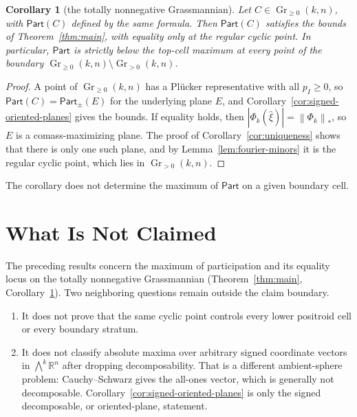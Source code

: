 \documentclass[11pt]{article}
\newtheorem{corollary}[theorem]{Corollary}
\newcommand{\Gr}{\operatorname{Gr}}
\newcommand{\Part}{\mathsf{Part}}
\newcommand{\R}{\mathbb{R}}
\newcommand{\abs}[1]{\left|#1\right|}
\newcommand{\norm}[1]{\left\|#1\right\|}
\begin{document}
\begin{corollary}[the totally nonnegative Grassmannian]\label{cor:tnn}
Let \(C\in\Gr_{\ge0}(k,n)\), with \(\Part(C)\) defined by the same formula.  Then \(\Part(C)\)
satisfies the bounds of Theorem~\ref{thm:main}, with equality only at the regular cyclic point.
In particular, \(\Part\) is strictly below the top-cell maximum at every point of the boundary
\(\Gr_{\ge0}(k,n)\setminus\Gr_{>0}(k,n)\).
\end{corollary}

\begin{proof}
A point of \(\Gr_{\ge0}(k,n)\) has a Plücker representative with all \(p_I\ge0\), so
\(\Part(C)=\Part_{\pm}(E)\) for the underlying plane \(E\), and
Corollary~\ref{cor:signed-oriented-planes} gives the bounds.  If equality holds, then
\(\abs{\Phi_k(\widehat{\xi})}=\norm{\Phi_k}_*\), so \(E\) is a comass-maximizing plane.  The
proof of Corollary~\ref{cor:uniqueness} shows that there is only one such plane, and by
Lemma~\ref{lem:fourier-minors} it is the regular cyclic point, which lies in \(\Gr_{>0}(k,n)\).
\end{proof}

\noindent The corollary does not determine the maximum of \(\Part\) on a given boundary cell.

\section{What Is Not Claimed}

The preceding results concern the maximum of participation and its equality
locus on the totally nonnegative Grassmannian
(Theorem~\ref{thm:main}, Corollary~\ref{cor:tnn}).  Two neighboring questions
remain outside the claim boundary.

\begin{enumerate}
\item It does not prove that the same cyclic point controls every lower
  positroid cell or every boundary stratum.
\item It does not classify absolute maxima over arbitrary signed coordinate
  vectors in \(\bigwedge^k\R^n\) after dropping decomposability.  That is a
  different ambient-sphere problem: Cauchy--Schwarz gives the all-ones vector,
  which is generally not decomposable.  Corollary~\ref{cor:signed-oriented-planes}
  is only the signed decomposable, or oriented-plane, statement.
\end{enumerate}
\end{document}
